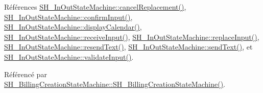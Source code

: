 Références \hyperlink{classSH__InOutStateMachine_a035d37535533d4805fe2606f38c19380}{S\-H\-\_\-\-In\-Out\-State\-Machine\-::cancel\-Replacement()}, \hyperlink{classSH__InOutStateMachine_a7f7d9c9300c1d05bce2c26029f28cc31}{S\-H\-\_\-\-In\-Out\-State\-Machine\-::confirm\-Input()}, \hyperlink{classSH__InOutStateMachine_ab3a12d1f9b658d8ffdc17669a6c065f2}{S\-H\-\_\-\-In\-Out\-State\-Machine\-::display\-Calendar()}, \hyperlink{classSH__InOutStateMachine_a037ed5e13ecfae2123a8d4940292e410}{S\-H\-\_\-\-In\-Out\-State\-Machine\-::receive\-Input()}, \hyperlink{classSH__InOutStateMachine_a9fa5db44086de2576c812f631aa4f60a}{S\-H\-\_\-\-In\-Out\-State\-Machine\-::replace\-Input()}, \hyperlink{classSH__InOutStateMachine_a526822c66b46aa0cd81ba4473fa5573f}{S\-H\-\_\-\-In\-Out\-State\-Machine\-::resend\-Text()}, \hyperlink{classSH__InOutStateMachine_a5e7f5958bae31696b6a8deab94ad2b4f}{S\-H\-\_\-\-In\-Out\-State\-Machine\-::send\-Text()}, et \hyperlink{classSH__InOutStateMachine_aec1b3fef3c1f82499aa1f73beaecd08a}{S\-H\-\_\-\-In\-Out\-State\-Machine\-::validate\-Input()}.



Référencé par \hyperlink{classSH__BillingCreationStateMachine_ad62b77fa4aeafe200056ff3974562f83}{S\-H\-\_\-\-Billing\-Creation\-State\-Machine\-::\-S\-H\-\_\-\-Billing\-Creation\-State\-Machine()}.


